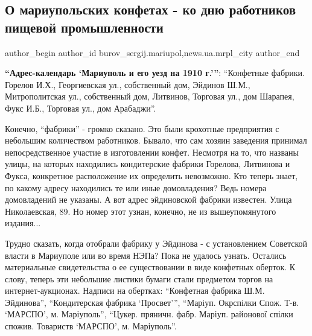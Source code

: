  
 
 
 
 
 
\subsection{О мариупольских конфетах - ко дню работников пищевой промышленности}
\label{sec:19_10_2019.stz.news.ua.mrpl_city.1.o_mariupol_konfetah}
 
\ifcmt
 author_begin
   author_id burov_sergij.mariupol,news.ua.mrpl_city
 author_end
\fi


\textbf{\enquote{Адрес-календарь \enquote{Мариуполь и его уезд на 1910 г.}}}: 
\enquote{Конфетные фабрики. Горелов И.Х., Георгиевская ул., собственный дом, Эйдинов Ш.М., Митрополитская
ул., собственный дом, Литвинов, Торговая ул., дом Шарапея, Фукс И.Б., Торговая
ул., дом Арабаджи}.

Конечно, \enquote{фабрики} - громко сказано. Это были крохотные предприятия с небольшим
количеством работников. Бывало, что сам хозяин заведения принимал
непосредственное участие в изготовлении конфет. Несмотря на то, что названы
улицы, на которых находились кондитерские фабрики Горелова, Литвинова и Фукса,
конкретное расположение их определить невозможно. Кто теперь знает, по какому
адресу находились те или иные домовладения? Ведь номера домовладений не
указаны. А вот адрес эйдиновской фабрики известен. Улица Николаевская, 89. Но
номер этот узнан, конечно, не из вышеупомянутого издания...

Трудно сказать, когда отобрали фабрику у Эйдинова - с установлением Советской
власти в Мариуполе или во время НЭПа? Пока не удалось узнать. Остались
материальные свидетельства о ее существовании в виде конфетных оберток. К
слову, теперь эти небольшие листики бумаги стали предметом торгов на
интернет-аукционах. Надписи на обертках: \enquote{Конфетная фабрика Ш.М. Эйдинова},
\enquote{Кондитерская фабрика \enquote{Просвет}}, \enquote{Маріуп. Окрспілки Спож. Т-в. 
\enquote{МАРСПО}, м. Маріуполь}, \enquote{Цукер. пряничн. фабр. Маріуп. районової спілки спожив. Товариств
\enquote{МАРСПО}, м. Маріуполь}.

